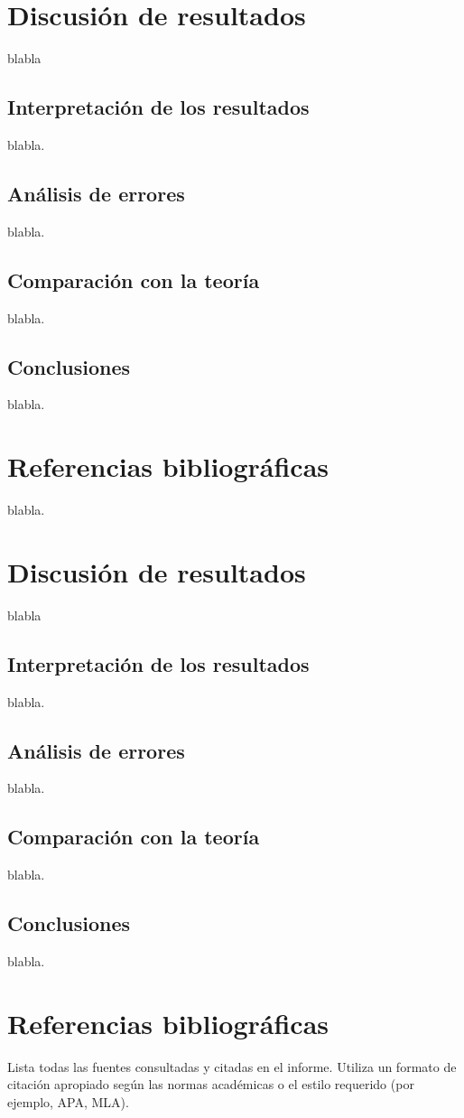 \documentclass[twocolumn,12pt]{article}
\begin{document}
    \twocolumn
    
    \section{Discusión de resultados}
    blabla
    
    \subsection{Interpretación de los resultados}
    blabla.
    
    \subsection{Análisis de errores}
    blabla.
    
    \subsection{Comparación con la teoría}
    blabla.
    
    \subsection{Conclusiones}
    blabla.
    
    \section{Referencias bibliográficas}
    blabla.
    

	
	\section{Discusión de resultados}
	blabla
	
	\subsection{Interpretación de los resultados}
	blabla.
	
	\subsection{Análisis de errores}
	blabla.
	
	\subsection{Comparación con la teoría}
	blabla.
	
	\subsection{Conclusiones}
	blabla.
	
	
	\section{Referencias bibliográficas}
	Lista todas las fuentes consultadas y citadas en el informe. Utiliza un formato de citación apropiado según las normas académicas o el estilo requerido (por ejemplo, APA, MLA).
\end{document}
